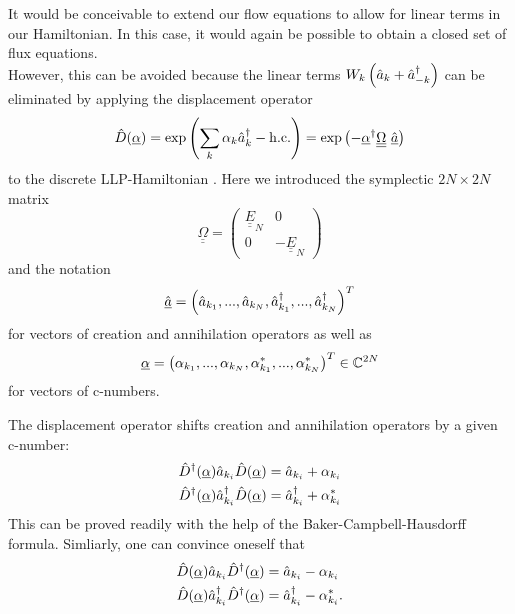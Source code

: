 It would be conceivable to extend our flow equations to allow for linear terms in our Hamiltonian. In this case, it would again be possible to obtain a closed set of flux equations. \\
However, this can be avoided because the linear terms  $W_k \left(\hat a_{ k}+\hat a^\dagger_{- k}\right)$ can be eliminated by applying the displacement operator 
\begin{equation}
\hat D(\underline\alpha)=\exp\left(\sum_k\alpha_k\CR_k-\mathrm{h.c.}\right)=\exp\left(-\underline\alpha^\dagger{\underline{\underline\Omega}}\ \underline{\hat a}\right)
\end{equation}
to the discrete LLP-Hamiltonian \cite{PracticalTraining}. Here we introduced the symplectic $2N\times2N$ matrix
\begin{equation}\label{symplectic_matrix}
{\underline{\underline\Omega}}=\begin{pmatrix}\underline{\underline E}_N & 0\\ 0 & -\underline{\underline E}_N\end{pmatrix}
\end{equation}
and the notation
\begin{equation}\label{cr_an_vector}
\underline{\hat a} = \left(\hat a_{k_1},...,\hat a_{k_N},\hat a^\dagger_{k_1},...,\hat a^\dagger_{k_N}\right)^T
\end{equation}
for vectors of creation and annihilation operators as well as
\begin{equation}\label{c-number_vector}
\underline\alpha = \left(\alpha_{k_1},...,\alpha_{k_N},\alpha_{k_1}^*,...,\alpha_{k_N}^*\right)^T\in\mathbb{C}^{2N}
\end{equation}
for vectors of c-numbers. \par %
The displacement operator shifts creation and annihilation operators by a given c-number:
\begin{subequations}
\begin{align}
\hat D^\dagger(\underline \alpha)\hat a_{k_i}\hat D(\underline\alpha)&=\hat a_{k_i}+\alpha_{k_i}\\
\hat D^\dagger(\underline \alpha)\hat a^\dagger_{k_i}\hat D(\underline\alpha)&=\hat a^\dagger_{k_i}+\alpha_{k_i}^*
\end{align}
\end{subequations}
This can be proved readily with the help of the Baker-Campbell-Hausdorff formula.
Simliarly, one can convince oneself that
\begin{subequations}
\begin{align}
\hat D(\underline \alpha)\hat a_{k_i}\hat D^\dagger(\underline\alpha)&=\hat a_{k_i}-\alpha_{k_i}\\
\hat D(\underline \alpha)\hat a^\dagger_{k_i}\hat D^\dagger(\underline\alpha)&=\hat a^\dagger_{k_i}-\alpha_{k_i}^*.
\end{align}
\end{subequations}

